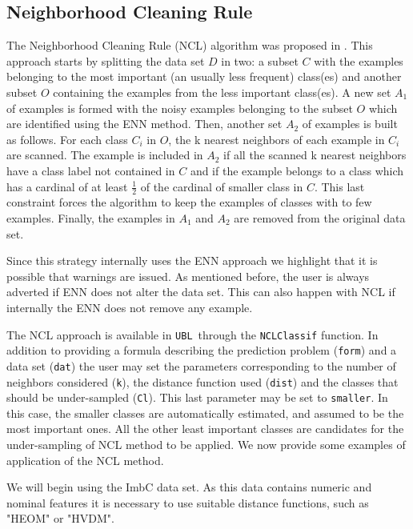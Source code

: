 \documentclass[10pt,a4paper]{article}\usepackage[]{graphicx}\usepackage[]{color}
\newcommand{\UBL}{\texttt{UBL}\ }
\begin{document}
\subsection{Neighborhood Cleaning Rule}\label{sec:NCL}

The Neighborhood Cleaning Rule (NCL) algorithm was proposed in \cite{laurikkala2001improving}. This approach starts by splitting the data set $D$ in two: a subset $C$ with the examples belonging to the most important (an usually less frequent) class(es) and another subset $O$ containing the examples from the less important class(es). A new set $A_1$ of examples is formed with the noisy examples belonging to the subset $O$ which are identified using the ENN method.
Then, another set $A_2$ of examples is built as follows. For each class $C_i$ in $O$, the k nearest neighbors of each example in $C_i$ are scanned. The example is included in $A_2$ if all the scanned k nearest neighbors have a class label not contained in $C$ and if the example belongs to a class which has a cardinal of at least $\frac{1}{2}$ of the cardinal of smaller class in $C$. This last constraint forces the algorithm to keep the examples of classes with to few examples.
Finally, the examples in $A_1$ and $A_2$ are removed from the original data set.

Since this strategy internally uses the ENN approach we highlight that it is possible that warnings are issued. As mentioned before, the user is always adverted if ENN does not alter the data set. This can also happen with NCL if internally the ENN does not remove any example.

The NCL approach is available in \UBL through the \texttt{NCLClassif} function. In addition to providing a formula describing the prediction problem (\texttt{form}) and a data set (\texttt{dat}) the user may set the parameters corresponding to the number of neighbors considered (\texttt{k}), the distance function used (\texttt{dist}) and the classes that should be under-sampled (\texttt{Cl}). This last parameter may be set to \texttt{smaller}. In this case, the smaller classes are automatically estimated, and assumed to be the most important ones. All the other least important classes are candidates for the under-sampling of NCL method to be applied. We now provide some examples of application of the NCL method.


We will begin using the ImbC data set. As this data contains numeric and nominal features it is necessary to use suitable distance functions, such as "HEOM" or "HVDM".
\end{document}
